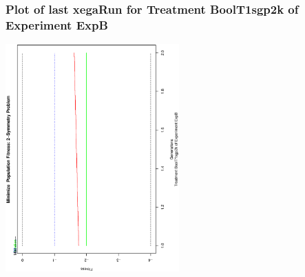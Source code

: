  \begin{frame}
 \frametitle{ Plot of last xegaRun for Treatment BoolT1sgp2k of Experiment ExpB }
 \begin{center}
\includegraphics[width=0.5\textwidth, angle=-90]
{ExpBPlotPopStatsFigure005.eps}
 \end{center}
 \label{report/ExpBPlotPopStatsFigure005.eps}  
 \end{frame}

